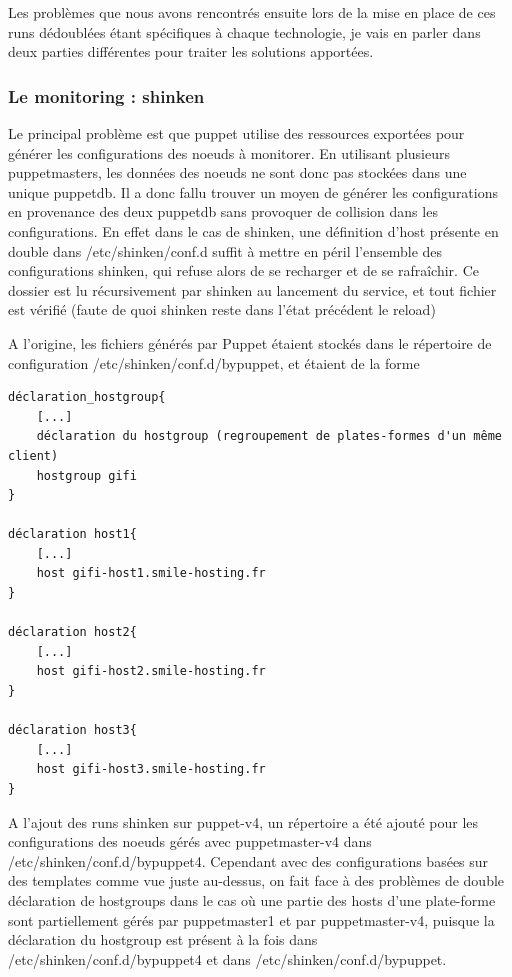 \documentclass[14 pt]{extreport}
\begin{document}
Les problèmes que nous avons rencontrés ensuite lors de la mise en place de ces runs dédoublées étant spécifiques à chaque technologie, je vais en parler dans deux parties différentes pour traiter les solutions apportées.

\subsubsection{Le monitoring : shinken}

Le principal problème est que puppet utilise des ressources exportées pour générer les configurations des noeuds à monitorer. En utilisant plusieurs puppetmasters, les données des noeuds ne sont donc pas stockées dans une unique puppetdb. Il a donc fallu trouver un moyen de générer les configurations en provenance des deux puppetdb sans provoquer de collision dans les configurations. En effet dans le cas de shinken, une définition d'host présente en double dans /etc/shinken/conf.d suffit à mettre en péril l'ensemble des configurations shinken, qui refuse alors de se recharger et de se rafraîchir. Ce dossier est lu récursivement par shinken au lancement du service, et tout fichier est vérifié (faute de quoi shinken reste dans l'état précédent le reload)

A l'origine, les fichiers générés par Puppet étaient stockés dans le répertoire de configuration /etc/shinken/conf.d/bypuppet, et étaient de la forme

\begin{Verbatim}[fontsize=\scriptsize]
déclaration_hostgroup{
	[...]
	déclaration du hostgroup (regroupement de plates-formes d'un même client)
	hostgroup gifi
}

déclaration host1{
	[...]
	host gifi-host1.smile-hosting.fr
}

déclaration host2{
	[...]
	host gifi-host2.smile-hosting.fr
}

déclaration host3{
	[...]
	host gifi-host3.smile-hosting.fr
}
\end{Verbatim}

A l'ajout des runs shinken sur puppet-v4, un répertoire a été ajouté pour les configurations des noeuds gérés avec puppetmaster-v4 dans /etc/shinken/conf.d/bypuppet4. Cependant avec des configurations basées sur des templates comme vue juste au-dessus, on fait face à des problèmes de double déclaration de hostgroups dans le cas où une partie des hosts d'une plate-forme sont partiellement gérés par puppetmaster1 et par puppetmaster-v4, puisque la déclaration du hostgroup est présent à la fois dans /etc/shinken/conf.d/bypuppet4 et dans /etc/shinken/conf.d/bypuppet.
\end{document}
